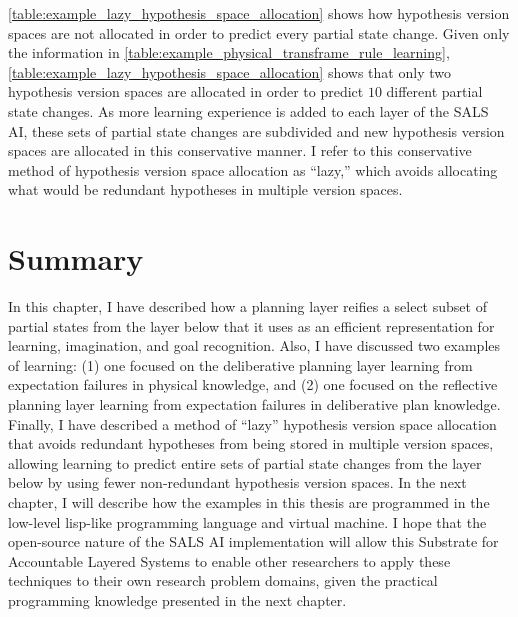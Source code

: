{\mbox{\autoref{table:example_lazy_hypothesis_space_allocation}}}
shows how hypothesis version spaces are not allocated in order to
predict every partial state change.  Given only the information in
{\mbox{\autoref{table:example_physical_transframe_rule_learning}}},
{\mbox{\autoref{table:example_lazy_hypothesis_space_allocation}}}
shows that only two hypothesis version spaces are allocated in order
to predict $10$ different partial state changes.  As more learning
experience is added to each layer of the SALS AI, these sets of
partial state changes are subdivided and new hypothesis version spaces
are allocated in this conservative manner.  I refer to this
conservative method of hypothesis version space allocation as
``lazy,'' which avoids allocating what would be redundant hypotheses
in multiple version spaces.

\section{Summary}

In this chapter, I have described how a planning layer reifies a
select subset of partial states from the layer below that it uses as
an efficient representation for learning, imagination, and goal
recognition.  Also, I have discussed two examples of learning: (1) one
focused on the deliberative planning layer learning from expectation
failures in physical knowledge, and (2) one focused on the reflective
planning layer learning from expectation failures in deliberative plan
knowledge.  Finally, I have described a method of ``lazy'' hypothesis
version space allocation that avoids redundant hypotheses from being
stored in multiple version spaces, allowing learning to predict entire
sets of partial state changes from the layer below by using fewer
non-redundant hypothesis version spaces.  In the next chapter, I will
describe how the examples in this thesis are programmed in the
low-level lisp-like programming language and virtual machine.  I hope
that the open-source nature of the SALS AI implementation will allow
this Substrate for Accountable Layered Systems to enable other
researchers to apply these techniques to their own research problem
domains, given the practical programming knowledge presented in the
next chapter.


